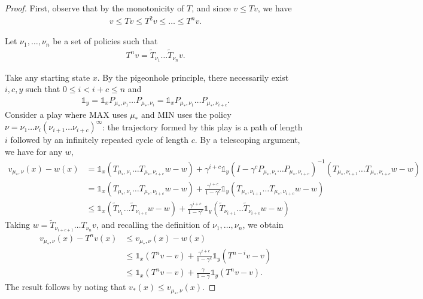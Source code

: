 \documentclass{article}
\def\1{{\mathds 1}}
\begin{document}
\begin{proof}
    First, observe that by the monotonicity of $T$, and since $v \le Tv$, we have
  \begin{align}
    v \le Tv \le T^2 v \le \dots \le T^n v.
  \end{align}
  
  Let $\nu_1,\dots,\nu_n$ be a set of policies such that
  \begin{align}
    T^n v = \tilde T_{\nu_1} \dots \tilde T_{\nu_n} v.
  \end{align}
  
  Take any starting state $x$. By the pigeonhole principle, there necessarily exist $i,c,y$ such that $0 \le i < i+c \le n$ and
  \begin{align}
    \1_y = \1_x P_{\mu_*,\nu_1} \dots P_{\mu_*,\nu_i} = \1_x P_{\mu_*,\nu_1} \dots P_{\mu_*,\nu_{i+c}}.
  \end{align}
  Consider a play where MAX uses $\mu_*$ and MIN uses the policy $\nu = \nu_1 \dots \nu_i (\nu_{i+1} \dots \nu_{i+c})^\infty$: the trajectory formed by this play is a path of length $i$ followed by an infinitely repeated cycle of length $c$.
  By a telescoping argument, we have for any $w$, 
  \begin{align}
    v_{\mu_*,\nu}(x) - w(x) & = \1_x (T_{\mu_*,\nu_1} \dots T_{\mu_*,\nu_{i+c}}w - w) + \gamma^{i+c} \1_y (I-\gamma^c P_{\mu_*,\nu_i} \dots P_{\mu_*,\nu_{i+c}})^{-1}(T_{\mu_*,\nu_{i+1}} \dots T_{\mu_*,\nu_{i+c}} w - w) \\
    & = \1_x (T_{\mu_*,\nu_1} \dots T_{\mu_*,\nu_{i+c}}w - w) + \frac{\gamma^{i+c}}{1-\gamma^c} \1_y (T_{\mu_*,\nu_{i+1}} \dots T_{\mu_*,\nu_{i+c}} w - w)  \\
    & \le \1_x (\tilde T_{\nu_1} \dots \tilde T_{\nu_{i+c}}w - w) + \frac{\gamma^{i+c}}{1-\gamma^c} \1_y (\tilde T_{\nu_{i+1}} \dots \tilde T_{\nu_{i+c}} w - w)
  \end{align}
  Taking $w = \tilde T_{\nu_{i+c+1}} \dots T_{\nu_{n}}v$, and recalling the definition of $\nu_1,\dots,\nu_n$, we obtain
  \begin{align}
    v_{\mu_*,\nu}(x) - T^n v(x) & \le v_{\mu_*,\nu}(x) - w(x) \\
 & \le \1_x (T^n v - v) + \frac{\gamma^{i+c}}{1-\gamma^c} \1_y (T^{n-i}v - v) \\
    & \le \1_x (T^n v - v) + \frac{\gamma}{1-\gamma} \1_y (T^{n}v - v).
  \end{align}
  The result follows by noting that $v_*(x) \le v_{\mu_*,\nu}(x)$.
\end{proof}
\end{document}
